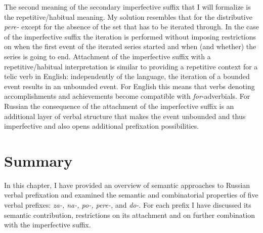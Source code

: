 
The second meaning of the secondary imperfective suffix that I will formalize is the repetitive/habitual meaning. My solution resembles that for the distributive \textit{pere-} except for the absence of the set that has to be iterated through. In the case of the imperfective suffix the iteration is performed without imposing restrictions on when the first event of the iterated series started and when (and whether) the series is going to end. Attachment of the imperfective suffix with a repetitive/habitual interpretation is similar to providing a repetitive context for a telic verb in English: independently of the language, the iteration of a bounded event results in an unbounded event. For English this means that verbs denoting accomplishments and achievements become compatible with \textit{for}-adverbials. For Russian the consequence of the attachment of the imperfective suffix is an additional layer of verbal structure that makes the event unbounded and thus imperfective and also opens additional prefixation possibilities. 


\section{Summary}
In this chapter, I have provided an overview of semantic approaches to Russian verbal prefixation and examined the semantic and combinatorial properties of five verbal prefixes: \textit{za-, na-, po-, pere-,} and \textit{do-}. For each prefix I have discussed its semantic contribution, restrictions on its attachment and on further combination with the imperfective suffix. 

